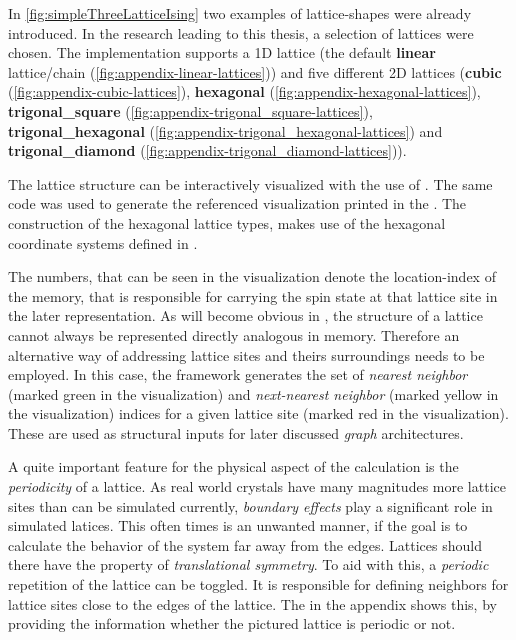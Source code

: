 In \autoref{fig:simpleThreeLatticeIsing} two examples of lattice-shapes were already introduced.
In the research leading to this thesis, a selection of lattices were chosen.
The implementation supports a 1D lattice (the default \textbf{linear} lattice/chain  (\autoref{fig:appendix-linear-lattices})) and five different 2D lattices 
(\textbf{cubic} (\autoref{fig:appendix-cubic-lattices}), \textbf{hexagonal} (\autoref{fig:appendix-hexagonal-lattices}), \textbf{trigonal\_square} (\autoref{fig:appendix-trigonal_square-lattices}), \textbf{trigonal\_hexagonal} (\autoref{fig:appendix-trigonal_hexagonal-lattices}) and \textbf{trigonal\_diamond} (\autoref{fig:appendix-trigonal_diamond-lattices})).

The lattice structure can be interactively visualized with the use of \cite{selfPhysics} .
The same code was used to generate the referenced visualization printed in the .
The construction of the hexagonal lattice types, makes use of the hexagonal coordinate systems defined in \cite[]{hexagonalGrids}.

The numbers, that can be seen in the visualization denote the location-index of the memory, that is responsible for carrying the spin state at that lattice site in the later representation. As will become obvious in , the structure of a lattice cannot always be represented directly analogous in memory. Therefore an alternative way of addressing lattice sites and theirs surroundings needs to be employed.
In this case, the framework generates the set of \emph{nearest neighbor} (marked green in the visualization) and \emph{next-nearest neighbor} (marked yellow in the visualization) indices for a given lattice site (marked red in the visualization). These are used as structural inputs for later discussed \emph{graph} architectures.

A quite important feature for the physical aspect of the calculation is the \emph{periodicity} of a lattice. 
As real world crystals have many magnitudes more lattice sites than can be simulated currently, \emph{boundary effects} play a significant role in simulated latices.
This often times is an unwanted manner, if the goal is to calculate the behavior of the system far away from the edges. 
Lattices should there have the property of \emph{translational symmetry}. 
To aid with this, a \emph{periodic} repetition of the lattice can be toggled. 
It is responsible for defining neighbors for lattice sites close to the edges of the lattice.
The  in the appendix shows this, by providing the information whether the pictured lattice is periodic or not.

